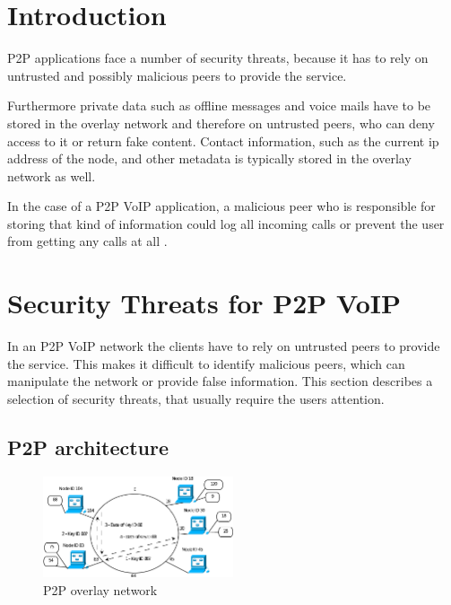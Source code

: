 \documentclass[a4paper,conference]{IEEEtran}
\begin{document}
\section{Introduction}

P2P applications face a number of security threats, because it has
to rely on untrusted and possibly malicious peers to provide the service.

Furthermore private data such as offline messages and voice mails have to be
stored in the overlay network and therefore on untrusted peers, who can
deny access to it or return fake content. Contact information, such as the
current ip address of the node, and other metadata is typically stored in the
overlay network as well.

In the case of a P2P VoIP application, a malicious peer who is
responsible for storing that kind of information could log all incoming calls or
prevent the user from getting any calls at all
\cite{touceda}.


\section{Security Threats for P2P VoIP}
\label{p2p}
In an P2P VoIP network the clients have to rely on untrusted peers to provide
the service. This makes it difficult to identify malicious peers, which can
manipulate
the network or provide false information. This section describes a selection of
security threats, that usually require the users attention.

\subsection{P2P architecture}
\begin{figure}
\centering
\includegraphics[width=0.5\textwidth]{p2p}

\caption{P2P overlay network \cite{touceda}}
\label{fig:p2p}
\end{figure}
\end{document}
